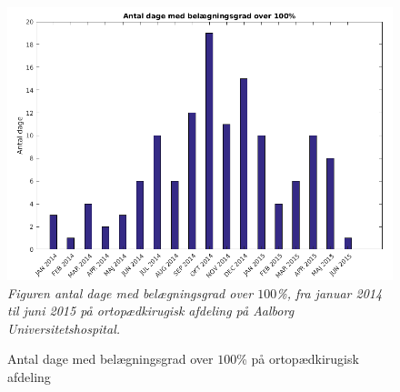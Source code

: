 \begin{figure}[H]
	\flushleft 
	\caption{Antal dage med belægningsgrad over $100$\% på ortopædkirugisk afdeling}
	\centering
	\includegraphics[scale=.5]{figures/antaldage.png}
	\label{antaldage}
	\flushleft
	\textit{Figuren antal dage med belægningsgrad over $100$\%, fra januar 2014 til juni 2015 på ortopædkirugisk afdeling på Aalborg Universitetshospital.}
\end{figure}